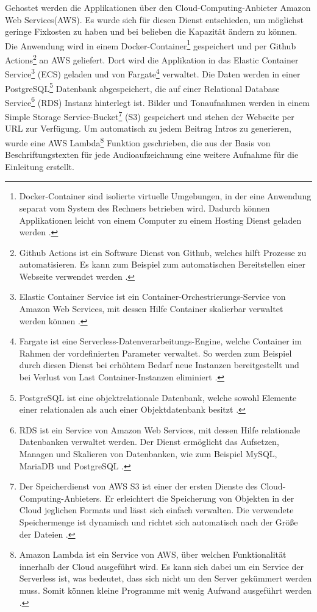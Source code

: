Gehostet werden die Applikationen über den Cloud-Computing-Anbieter Amazon Web Services\footnotemark (AWS).
	Es wurde sich für diesen Dienst entschieden, um möglichst geringe Fixkosten zu haben und bei belieben die Kapazität ändern zu können. Die Anwendung wird in einem Docker-Container\footnote{Docker-Container sind isolierte virtuelle Umgebungen, in der eine Anwendung separat vom System des Rechners betrieben wird. Dadurch können Applikationen leicht von einem Computer zu einem Hosting Dienst geladen werden \parencite{docker_container}.} gespeichert und per Github Actions\footnote{Github Actions ist ein Software Dienst von Github, welches hilft Prozesse zu automatisieren. Es kann zum Beispiel zum automatischen Bereitstellen einer Webseite verwendet werden \parencite{github_actions}.} an AWS geliefert. Dort wird die Applikation in das Elastic Container Service\footnote{Elastic Container Service ist ein Container-Orchestrierungs-Service von Amazon Web Services, mit dessen Hilfe Container skalierbar verwaltet werden können \parencite{aws_ecs}.} (ECS) geladen und von Fargate\footnote{Fargate ist eine Serverless-Datenverarbeitungs-Engine, welche Container im Rahmen der vordefinierten Parameter verwaltet. So werden zum Beispiel durch diesen Dienst bei erhöhtem Bedarf neue Instanzen bereitgestellt und bei Verlust von Last Container-Instanzen eliminiert \parencite{aws_fargate}.} verwaltet. Die Daten werden in einer PostgreSQL\footnote{PostgreSQL ist eine objektrelationale Datenbank, welche sowohl Elemente einer relationalen als auch einer Objektdatenbank besitzt \parencite{postgresql}.} Datenbank abgespeichert, die auf einer Relational Database Service\footnote{RDS ist ein Service von Amazon Web Services, mit dessen Hilfe relationale Datenbanken verwaltet werden. Der Dienst ermöglicht das Aufsetzen, Managen und Skalieren von Datenbanken, wie zum Beispiel MySQL, MariaDB und PostgreSQL \parencite[vlg.][S.161 f.]{baron_aws_2016}.} (RDS) Instanz hinterlegt ist. Bilder und Tonaufnahmen werden in einem Simple Storage Service-Bucket\footnote{Der Speicherdienst von AWS S3 ist einer der ersten Dienste des Cloud-Computing-Anbieters. Er erleichtert die Speicherung von Objekten in der Cloud jeglichen Formats und lässt sich einfach verwalten. Die verwendete Speichermenge ist dynamisch und richtet sich automatisch nach der Größe der Dateien \parencite[vlg.][S. 23]{baron_aws_2016}.} (S3) gespeichert und stehen der Webseite per URL zur Verfügung. Um automatisch zu jedem Beitrag Intros zu generieren, wurde eine AWS Lambda\footnote{Amazon Lambda ist ein Service von AWS, über welchen Funktionalität innerhalb der Cloud ausgeführt wird. Es kann sich dabei um ein Service der Serverless ist, was bedeutet, dass sich nicht um den Server gekümmert werden muss. Somit können kleine Programme mit wenig Aufwand ausgeführt werden \parencites[vlg.][Kap. 15.3]{wolff_microservices_2018}{aws_lambda}.} Funktion geschrieben, die aus der Basis von Beschriftungstexten für jede Audioaufzeichnung eine weitere Aufnahme für die Einleitung erstellt.

